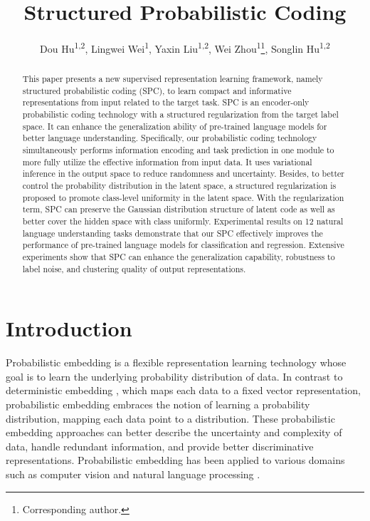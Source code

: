 \documentclass[letterpaper]{article} %
\title{Structured Probabilistic Coding}
\author{Dou Hu\textsuperscript{\rm 1,\rm 2}, Lingwei Wei\textsuperscript{\rm 1}, Yaxin Liu\textsuperscript{\rm 1,\rm 2}, Wei Zhou\textsuperscript{\rm 1}\thanks{Corresponding author.}, Songlin Hu\textsuperscript{{\rm 1},{\rm 2}}\footnotemark[1] 
}
\begin{document}
\maketitle 
\begin{abstract}
This paper presents a new supervised representation learning framework, namely structured probabilistic coding (SPC), to learn compact and informative representations from input related to the target task. SPC is an encoder-only probabilistic coding technology with a structured regularization from the target label space. It can enhance the generalization ability of pre-trained language models for better language understanding. Specifically, our probabilistic coding technology simultaneously performs information encoding and task prediction in one module to more fully utilize the effective information from input data. It uses variational inference in the output space to reduce randomness and uncertainty. Besides, to better control the probability distribution in the latent space, a structured regularization is proposed to promote class-level uniformity in the latent space. With the regularization term, SPC can preserve the Gaussian distribution structure of latent code as well as better cover the hidden space with class uniformly. Experimental results on 12 natural language understanding tasks demonstrate that our SPC effectively improves the performance of pre-trained language models for classification and regression. Extensive experiments show that SPC can enhance the generalization capability, robustness to label noise, and clustering quality of output representations.

\end{abstract}

\section{Introduction}

Probabilistic embedding \cite{DBLP:journals/corr/VilnisM14} is a flexible representation learning technology whose goal is to learn the underlying probability distribution of data. In contrast to deterministic embedding \cite{DBLP:conf/iclr/PereyraTCKH17,DBLP:conf/iclr/MiyatoDG17,gunel2020supervised}, which maps each data to a fixed vector representation, probabilistic embedding embraces the notion of learning a probability distribution, mapping each data point to a distribution.
These probabilistic embedding approaches can better describe the uncertainty and complexity of data, handle redundant information, and provide better discriminative representations.
Probabilistic embedding has been applied to various domains such as computer vision \cite{DBLP:conf/iclr/OhMPRSG19,DBLP:conf/iccv/ShiJ19} and natural language processing \cite{DBLP:conf/iclr/MahabadiBH21,DBLP:conf/emnlp/0001HDZJMS22}.
\end{document}
